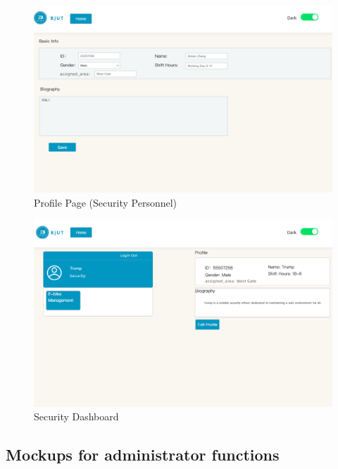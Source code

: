 \documentclass[12pt]{article}
\begin{document}
\begin{figure}[H]
    \centering
    \includegraphics[width=\textwidth]{mockups/security/profile.png}
    \caption{Profile Page (Security Personnel)}
    \label{fig:security_profile_page}
\end{figure}

\begin{figure}[H]
    \centering
    \includegraphics[width=\textwidth]{mockups/security/securitydash.png}
    \caption{Security Dashboard}
    \label{fig:security_dashboard_page}
\end{figure}

\subsection{Mockups for administrator functions}
\end{document}
